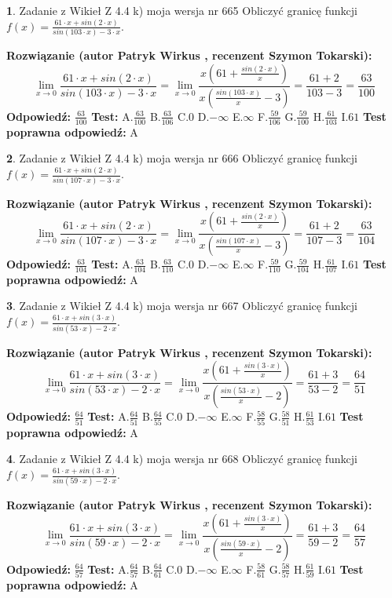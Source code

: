 \documentclass[12pt, a4paper]{article}
\theoremstyle{definition} %
\newtheorem{zad}{}
\newcommand{\zadStart}[1]{\begin{zad}#1\newline}
\newcommand{\zadStop}{\end{zad}}
\newcommand{\rozwStart}[2]{\noindent \textbf{Rozwiązanie (autor #1 , recenzent #2): }\newline}
\newcommand{\rozwStop}{\newline}
\newcommand{\odpStart}{\noindent \textbf{Odpowiedź:}\newline}
\newcommand{\odpStop}{\newline}
\newcommand{\testStart}{\noindent \textbf{Test:}\newline}
\newcommand{\testStop}{\newline}
\newcommand{\kluczStart}{\noindent \textbf{Test poprawna odpowiedź:}\newline}
\newcommand{\kluczStop}{\newline}
\begin{document}
\zadStart{Zadanie z Wikieł Z 4.4 k) moja wersja nr 665}
Obliczyć granicę funkcji $f(x)=\frac{61\cdot x +sin(2\cdot x)}{sin(103\cdot x) -3\cdot x}$.
\zadStop
\rozwStart{Patryk Wirkus}{Szymon Tokarski}
$$\lim\limits_{x\to 0}\frac{61\cdot x +sin(2\cdot x)}{sin(103\cdot x) -3\cdot x}
=\lim\limits_{x\to 0}\frac{x(61+\frac{sin(2\cdot x)}{x})}{x(\frac{sin(103\cdot x)}{x}-3)}
=\frac{61+2}{103-3} = \frac{63}{100}$$
\rozwStop
\odpStart
$\frac{63}{100}$
\odpStop
\testStart
A.$\frac{63}{100}$
B.$\frac{63}{106}$
C.$0$
D.$-\infty$
E.$\infty$
F.$\frac{59}{106}$
G.$\frac{59}{100}$
H.$\frac{61}{103}$
I.$61$
\testStop
\kluczStart
A
\kluczStop



\zadStart{Zadanie z Wikieł Z 4.4 k) moja wersja nr 666}
Obliczyć granicę funkcji $f(x)=\frac{61\cdot x +sin(2\cdot x)}{sin(107\cdot x) -3\cdot x}$.
\zadStop
\rozwStart{Patryk Wirkus}{Szymon Tokarski}
$$\lim\limits_{x\to 0}\frac{61\cdot x +sin(2\cdot x)}{sin(107\cdot x) -3\cdot x}
=\lim\limits_{x\to 0}\frac{x(61+\frac{sin(2\cdot x)}{x})}{x(\frac{sin(107\cdot x)}{x}-3)}
=\frac{61+2}{107-3} = \frac{63}{104}$$
\rozwStop
\odpStart
$\frac{63}{104}$
\odpStop
\testStart
A.$\frac{63}{104}$
B.$\frac{63}{110}$
C.$0$
D.$-\infty$
E.$\infty$
F.$\frac{59}{110}$
G.$\frac{59}{104}$
H.$\frac{61}{107}$
I.$61$
\testStop
\kluczStart
A
\kluczStop



\zadStart{Zadanie z Wikieł Z 4.4 k) moja wersja nr 667}
Obliczyć granicę funkcji $f(x)=\frac{61\cdot x +sin(3\cdot x)}{sin(53\cdot x) -2\cdot x}$.
\zadStop
\rozwStart{Patryk Wirkus}{Szymon Tokarski}
$$\lim\limits_{x\to 0}\frac{61\cdot x +sin(3\cdot x)}{sin(53\cdot x) -2\cdot x}
=\lim\limits_{x\to 0}\frac{x(61+\frac{sin(3\cdot x)}{x})}{x(\frac{sin(53\cdot x)}{x}-2)}
=\frac{61+3}{53-2} = \frac{64}{51}$$
\rozwStop
\odpStart
$\frac{64}{51}$
\odpStop
\testStart
A.$\frac{64}{51}$
B.$\frac{64}{55}$
C.$0$
D.$-\infty$
E.$\infty$
F.$\frac{58}{55}$
G.$\frac{58}{51}$
H.$\frac{61}{53}$
I.$61$
\testStop
\kluczStart
A
\kluczStop



\zadStart{Zadanie z Wikieł Z 4.4 k) moja wersja nr 668}
Obliczyć granicę funkcji $f(x)=\frac{61\cdot x +sin(3\cdot x)}{sin(59\cdot x) -2\cdot x}$.
\zadStop
\rozwStart{Patryk Wirkus}{Szymon Tokarski}
$$\lim\limits_{x\to 0}\frac{61\cdot x +sin(3\cdot x)}{sin(59\cdot x) -2\cdot x}
=\lim\limits_{x\to 0}\frac{x(61+\frac{sin(3\cdot x)}{x})}{x(\frac{sin(59\cdot x)}{x}-2)}
=\frac{61+3}{59-2} = \frac{64}{57}$$
\rozwStop
\odpStart
$\frac{64}{57}$
\odpStop
\testStart
A.$\frac{64}{57}$
B.$\frac{64}{61}$
C.$0$
D.$-\infty$
E.$\infty$
F.$\frac{58}{61}$
G.$\frac{58}{57}$
H.$\frac{61}{59}$
I.$61$
\testStop
\kluczStart
A
\kluczStop
\end{document}
